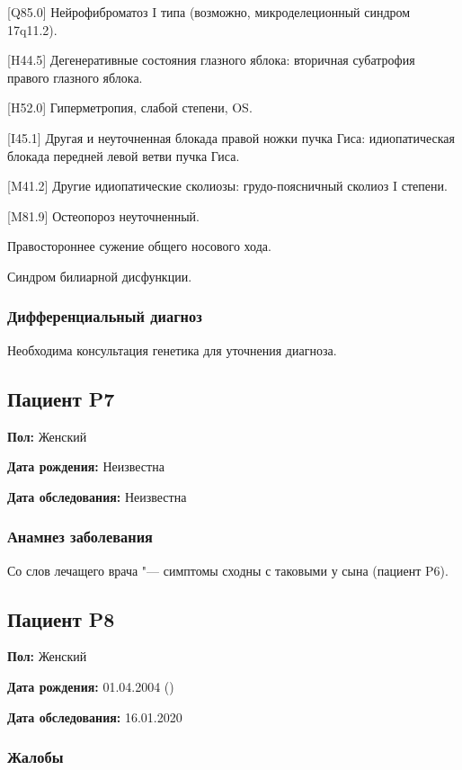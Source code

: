 \documentclass[a4paper,14pt]{extarticle}
\newcommand{\DS}[2]{[#2] #1}
\begin{document}
\DS{Нейрофиброматоз I типа}{Q85.0} (возможно, микроделеционный синдром 17q11.2).

\DS{Дегенеративные состояния глазного яблока: вторичная субатрофия правого глазного яблока}{H44.5}.

\DS{Гиперметропия, слабой степени, OS}{H52.0}.

\DS{Другая и неуточненная блокада правой ножки пучка Гиса: идиопатическая блокада передней левой ветви пучка Гиса}{I45.1}.

\DS{Другие идиопатические сколиозы: грудо-поясничный сколиоз I степени}{M41.2}.

\DS{Остеопороз неуточненный}{M81.9}.

Правостороннее сужение общего носового хода.

Синдром билиарной дисфункции.

\subsubsection*{Дифференциальный диагноз}

Необходима консультация генетика для уточнения диагноза.

\newpage
\subsection*{Пациент P7}

\textbf{Пол:} Женский

\textbf{Дата рождения:} Неизвестна

\textbf{Дата обследования:} Неизвестна

\subsubsection*{Анамнез заболевания}

Со слов лечащего врача "--- симптомы сходны с таковыми у сына (пациент P6).

\newpage
\subsection*{Пациент P8}

\textbf{Пол:} Женский

\textbf{Дата рождения:} 01.04.2004 ()

\textbf{Дата обследования:} 16.01.2020

\subsubsection*{Жалобы}
\end{document}
